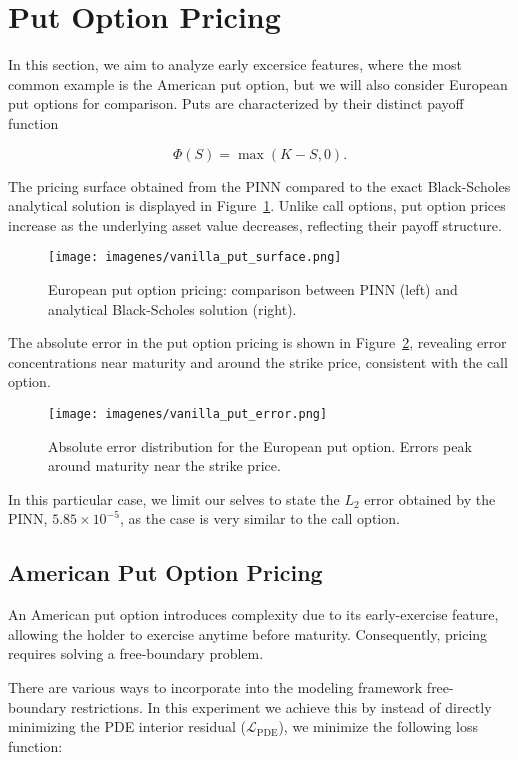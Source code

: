 \documentclass[12pt]{report} %
\theoremstyle{plain}           %
\theoremstyle{definition}      %
\theoremstyle{remark}          %
\begin{document}
\section{Put Option Pricing}

In this section, we aim to analyze early excersice features, where the most common example is the American put option,
but we will also consider European put options for comparison. Puts are characterized by their distinct 
payoff function 

$$\Phi(S) = \max(K - S, 0).$$

The pricing surface obtained from the PINN compared to the exact Black-Scholes analytical solution is 
displayed in Figure~\ref{fig:put_option}. Unlike call options, put option prices increase as 
the underlying asset value decreases, reflecting their payoff structure.

\begin{figure}[H]
	\centering
	\texttt{[image: imagenes/vanilla\_put\_surface.png]}
	\caption{European put option pricing: comparison between PINN (left) and analytical Black-Scholes solution (right).}
	\label{fig:put_option}
\end{figure}

The absolute error in the put option pricing is shown in 
Figure~\ref{fig:put_option_error}, revealing error concentrations near maturity 
and around the strike price, consistent with the call option.

\begin{figure}[H]
	\centering
	\texttt{[image: imagenes/vanilla\_put\_error.png]}
	\caption{Absolute error distribution for the European put option. Errors peak 
	around maturity near the strike price.}
	\label{fig:put_option_error}
\end{figure}

In this particular case, we limit our selves to state the $L_2$ error obtained by the PINN, \(5.85\times10^{-5}\), as 
the case is very similar to the call option.

\subsection{American Put Option Pricing}

An American put option introduces complexity due to its early-exercise feature, 
allowing the holder to exercise anytime before maturity. Consequently, pricing requires 
solving a free-boundary problem. 

There are various ways to incorporate into the modeling framework free-boundary restrictions. In this experiment
we achieve this by instead of directly minimizing the PDE interior residual (\(\mathcal{L}_{\text{PDE}}\)), we minimize the
following loss function:
\end{document}
